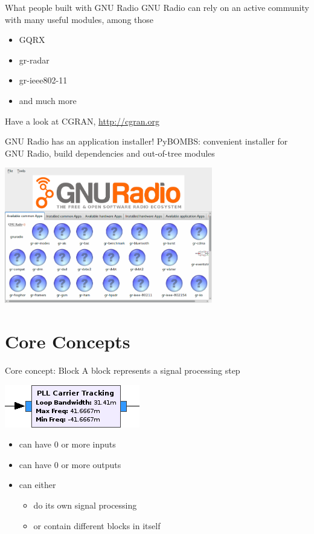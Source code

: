 \documentclass{beamer}
\begin{document}
\begin{frame}{What people built with GNU Radio}
  GNU Radio can rely on an active community with many useful modules, among those
  \begin{itemize}
  \item GQRX
  \item gr-radar
  \item gr-ieee802-11
  \item and much more
  \end{itemize}
  Have a look at CGRAN, \url{http://cgran.org}
\end{frame}

\begin{frame}{GNU Radio has an application installer!}
  PyBOMBS: convenient installer for GNU Radio, build dependencies and out-of-tree modules

  \includegraphics[height=16em]{pybombs.png}\centering
\end{frame}

\section{Core Concepts}

\begin{frame}{Core concept: Block}
  A block represents a signal processing step

  \includegraphics{block.png}\centering

  \begin{itemize}
    \item can have 0 or more inputs
    \item can have 0 or more outputs
    \item can either
      \begin{itemize}
        \item do its own signal processing
        \item or contain different blocks in itself
      \end{itemize}
  \end{itemize}
\end{frame}
\end{document}
